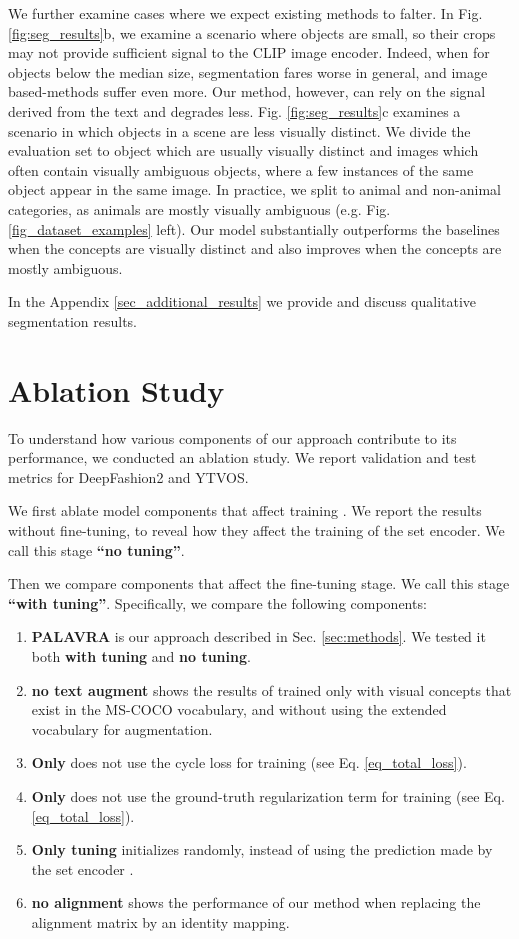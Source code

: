 \documentclass[runningheads]{llncs}
\newcommand{\secref}[1]{Sec. \ref{#1}}
\newcommand{\figref}[1]{Fig. \ref{#1}}
\begin{document}
We further examine cases where we expect existing methods to falter. In Fig. \ref{fig:seg_results}b, we examine a scenario where objects are small, so their crops may not provide sufficient signal to the CLIP image encoder. Indeed, when for objects below the median size, segmentation fares worse in general, and image based-methods suffer even more. Our method, however, can rely on the signal derived from the text and degrades less. 
Fig. \ref{fig:seg_results}c examines a scenario in which objects in a scene are less visually distinct. We divide the evaluation set to object which are usually visually distinct and images which often contain visually ambiguous objects, where a few instances of the same object appear in the same image. In practice, we split to animal and non-animal categories, as animals are mostly visually ambiguous (e.g. \figref{fig_dataset_examples} left).
Our model substantially outperforms the baselines when the concepts are visually distinct and also improves when the concepts are mostly ambiguous.

In the Appendix \ref{sec_additional_results} we provide and discuss qualitative segmentation results. 


\section{Ablation Study}
\label{sec_ablation_study}
To understand how various components of our approach contribute to its performance, we conducted an ablation study. We report validation and test metrics for DeepFashion2 and YTVOS.

We first ablate model components that affect training . We report the results without fine-tuning, to reveal how they affect the training of the set encoder. We call this stage \textbf{``no tuning''}.

Then we compare components that affect the fine-tuning stage. We call this stage \textbf{``with tuning''}. Specifically, we compare the following components:
\begin{enumerate}
    \item \textbf{PALAVRA} is our approach described in \secref{sec:methods}. We tested it both \textbf{with tuning} and \textbf{no tuning}.
    \item \textbf{no text augment} shows the results of   trained only with visual concepts that exist in the MS-COCO vocabulary, and without using the extended vocabulary for augmentation.
    \item \textbf{Only } does not use the cycle loss for training  (see Eq. \ref{eq_total_loss}).
    \item \textbf{Only } does not use the ground-truth regularization term for training  (see Eq. \ref{eq_total_loss}).
    \item \textbf{Only tuning} initializes  randomly, instead of using the prediction made by the set encoder .
    \item \textbf{no alignment} shows the performance of our method when replacing the alignment matrix  by an identity mapping.
\end{enumerate}
\end{document}
